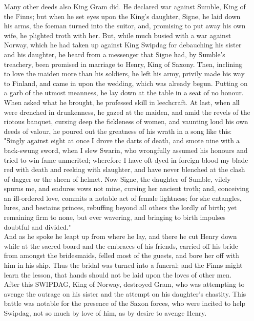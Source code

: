 \documentclass[10pt,a4paper]{report}
\begin{document}
Many other deeds also King Gram did. He declared war against Sumble, King of the Finns; but when he set eyes upon the King's daughter, Signe, he laid down his arms, the foeman turned into the suitor, and, promising to put away his own wife, he plighted troth with her. But, while much busied with a war against Norway, which he had taken up against King Swipdag for debauching his sister and his daughter, he heard from a messenger that Signe had, by Sumble's treachery, been promised in marriage to Henry, King of Saxony. Then, inclining to love the maiden more than his soldiers, he left his army, privily made his way to Finland, and came in upon the wedding, which was already begun. Putting on a garb of the utmost meanness, he lay down at the table in a seat of no honour. When asked what he brought, he professed skill in leechcraft. At last, when all were drenched in drunkenness, he gazed at the maiden, and amid the revels of the riotous banquet, cursing deep the fickleness of women, and vaunting loud his own deeds of valour, he poured out the greatness of his wrath in a song like this:\\

"Singly against eight at once I drove the darts of death, and smote nine with a back-swung sword, when I slew Swarin, who wrongfully assumed his honours and tried to win fame unmerited; wherefore I have oft dyed in foreign blood my blade red with death and reeking with slaughter, and have never blenched at the clash of dagger or the sheen of helmet. Now Signe, the daughter of Sumble, vilely spurns me, and endures vows not mine, cursing her ancient troth; and, conceiving an ill-ordered love, commits a notable act of female lightness; for she entangles, lures, and bestains princes, rebuffing beyond all others the lordly of birth; yet remaining firm to none, but ever wavering, and bringing to birth impulses doubtful and divided."\\

And as he spoke he leapt up from where he lay, and there he cut Henry down while at the sacred board and the embraces of his friends, carried off his bride from amongst the bridesmaids, felled most of the guests, and bore her off with him in his ship. Thus the bridal was turned into a funeral; and the Finns might learn the lesson, that hands should not be laid upon the loves of other men.\\

After this SWIPDAG, King of Norway, destroyed Gram, who was attempting to avenge the outrage on his sister and the attempt on his daughter's chastity. This battle was notable for the presence of the Saxon forces, who were incited to help Swipdag, not so much by love of him, as by desire to avenge Henry.\\
\end{document}
